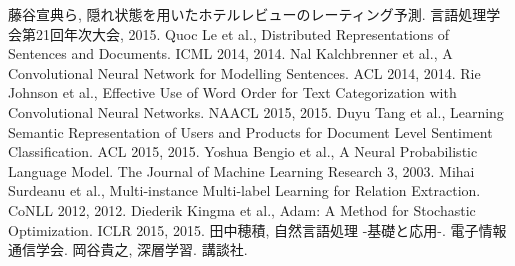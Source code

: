
\begin{thebibliography}{9}
  藤谷宣典ら,
  隠れ状態を用いたホテルレビューのレーティング予測.
  言語処理学会第21回年次大会, 2015.
  Quoc Le et al.,
  Distributed Representations of Sentences and Documents.
  ICML 2014, 2014.
  Nal Kalchbrenner et al.,
  A Convolutional Neural Network for Modelling Sentences.
  ACL 2014, 2014.
  Rie Johnson et al.,
  Effective Use of Word Order for Text Categorization
  with Convolutional Neural Networks.
  NAACL 2015, 2015.
  Duyu Tang et al.,
  Learning Semantic Representation of Users and Products
  for Document Level Sentiment Classification.
  ACL 2015, 2015.
  Yoshua Bengio et al.,
  A Neural Probabilistic Language Model.
  The Journal of Machine Learning Research 3, 2003.
  Mihai Surdeanu et al.,
  Multi-instance Multi-label Learning for Relation Extraction.
  CoNLL 2012, 2012.
  Diederik Kingma et al.,
  Adam: A Method for Stochastic Optimization.
  ICLR 2015, 2015.
  田中穂積,
  自然言語処理 -基礎と応用-.
  電子情報通信学会.
  岡谷貴之,
  深層学習.
  講談社.
\end{thebibliography}
